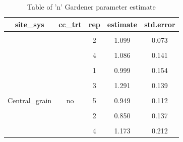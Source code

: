 \documentclass[
]{article}
\begin{document}
\begin{table}[H]

\caption{\label{tab:paramsalp}Table of 'n' Gardener parameter estimate}
\centering
\begin{tabular}[t]{ccccc}
\toprule
site\_sys & cc\_trt & rep & estimate & std.error\\
\midrule
\cellcolor{gray!6}{} & \cellcolor{gray!6}{} & \cellcolor{gray!6}{1} & \cellcolor{gray!6}{0.987} & \cellcolor{gray!6}{0.079}\\

 &  & 2 & 1.099 & 0.073\\

\cellcolor{gray!6}{} & \cellcolor{gray!6}{} & \cellcolor{gray!6}{3} & \cellcolor{gray!6}{1.106} & \cellcolor{gray!6}{0.219}\\

 &  & 4 & 1.086 & 0.141\\

\cellcolor{gray!6}{} & \cellcolor{gray!6}{\multirow{-5}{*}{\centering\arraybackslash cc}} & \cellcolor{gray!6}{5} & \cellcolor{gray!6}{1.468} & \cellcolor{gray!6}{0.198}\\

 &  & 1 & 0.999 & 0.154\\

\cellcolor{gray!6}{} & \cellcolor{gray!6}{} & \cellcolor{gray!6}{2} & \cellcolor{gray!6}{1.007} & \cellcolor{gray!6}{0.110}\\

 &  & 3 & 1.291 & 0.139\\

\cellcolor{gray!6}{} & \cellcolor{gray!6}{} & \cellcolor{gray!6}{4} & \cellcolor{gray!6}{1.264} & \cellcolor{gray!6}{0.153}\\

\multirow{-10}{*}{\centering\arraybackslash Central\_grain} & \multirow{-5}{*}{\centering\arraybackslash no} & 5 & 0.949 & 0.112\\
\cmidrule{1-5}
\cellcolor{gray!6}{} & \cellcolor{gray!6}{} & \cellcolor{gray!6}{1} & \cellcolor{gray!6}{0.813} & \cellcolor{gray!6}{0.158}\\

 &  & 2 & 0.850 & 0.137\\

\cellcolor{gray!6}{} & \cellcolor{gray!6}{} & \cellcolor{gray!6}{3} & \cellcolor{gray!6}{1.006} & \cellcolor{gray!6}{0.220}\\

 &  & 4 & 1.173 & 0.212\\


\end{tabular}
\end{table}
\end{document}

